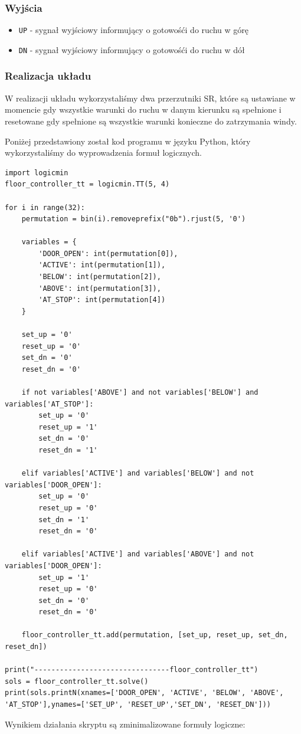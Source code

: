 \documentclass[a4paper]{article}
\begin{document}
\subsubsection{Wyjścia}
\begin{itemize}
    \item \verb|UP| - sygnał wyjściowy informujący o gotowośći do ruchu w górę
    \item \verb|DN| - sygnał wyjściowy informujący o gotowośći do ruchu w dół
\end{itemize}

\subsubsection{Realizacja układu}
W realizacji układu wykorzystaliśmy dwa przerzutniki SR, które są ustawiane w momencie gdy wszystkie
warunki do ruchu w danym kierunku są spełnione i resetowane gdy spełnione są wszystkie warunki konieczne
do zatrzymania windy.

Poniżej przedstawiony został kod programu w języku Python, który wykorzystaliśmy do wyprowadzenia
formuł logicznych.
\begin{verbatim}
import logicmin
floor_controller_tt = logicmin.TT(5, 4)

for i in range(32):
    permutation = bin(i).removeprefix("0b").rjust(5, '0')
    
    variables = {
        'DOOR_OPEN': int(permutation[0]),
        'ACTIVE': int(permutation[1]),
        'BELOW': int(permutation[2]),
        'ABOVE': int(permutation[3]),
        'AT_STOP': int(permutation[4])
    }

    set_up = '0'
    reset_up = '0'
    set_dn = '0'
    reset_dn = '0'

    if not variables['ABOVE'] and not variables['BELOW'] and variables['AT_STOP']:
        set_up = '0'
        reset_up = '1'
        set_dn = '0'
        reset_dn = '1'

    elif variables['ACTIVE'] and variables['BELOW'] and not variables['DOOR_OPEN']:
        set_up = '0'
        reset_up = '0'
        set_dn = '1'
        reset_dn = '0'

    elif variables['ACTIVE'] and variables['ABOVE'] and not variables['DOOR_OPEN']:
        set_up = '1'
        reset_up = '0'
        set_dn = '0'
        reset_dn = '0'

    floor_controller_tt.add(permutation, [set_up, reset_up, set_dn, reset_dn])

print("--------------------------------floor_controller_tt")
sols = floor_controller_tt.solve()
print(sols.printN(xnames=['DOOR_OPEN', 'ACTIVE', 'BELOW', 'ABOVE', 'AT_STOP'],ynames=['SET_UP', 'RESET_UP','SET_DN', 'RESET_DN']))
\end{verbatim}
Wynikiem działania skryptu są zminimalizowane formuły logiczne:
\end{document}
